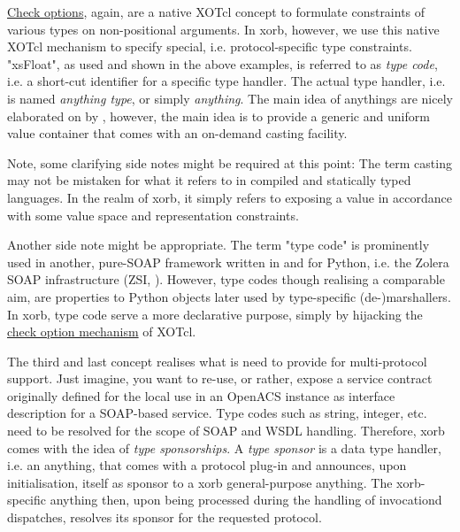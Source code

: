 \href{http://media.wu-wien.ac.at/doc/tutorial.html#non-pos-args}{Check options}, again, are a native XOTcl concept to formulate constraints of various types on non-positional arguments. In xorb, however, we use this native XOTcl mechanism to specify special, i.e. protocol-specific type constraints. "xsFloat", as used and shown in the above examples, is referred to as \emph{type code}, i.e. a short-cut identifier for a specific type handler. The actual type handler, i.e.  is named \emph{anything type}, or simply \emph{anything}. The main idea of anythings are nicely elaborated on by \cite{sommerlad:1998,maetzel:1996}, however, the main idea is to provide a generic and uniform value container that comes with an on-demand casting facility. 
\begin{hints}
\item Note, some clarifying side notes might be required at this point: The term casting may not be mistaken for what it refers to in compiled and statically typed languages. In the realm of xorb, it simply refers to exposing a value in accordance with some value space and representation constraints.
\item Another side note might be appropriate. The term "type code" is prominently used in another, pure-SOAP framework written in and for Python, i.e. the Zolera SOAP infrastructure (ZSI, \cite{zsi:2007}). However, type codes though realising a comparable aim, are properties to Python objects later used by type-specific (de-)marshallers. In xorb, type code serve a more declarative purpose, simply by hijacking the \href{http://media.wu-wien.ac.at/doc/tutorial.html#non-pos-args}{check option mechanism} of XOTcl.
\end{hints}
The third and last concept realises what is need to provide for multi-protocol support. Just imagine, you want to re-use, or rather, expose a service contract originally defined for the local use in an OpenACS instance as interface description for a SOAP-based service. Type codes such as string, integer, etc. need to be resolved for the scope of SOAP and WSDL handling. Therefore, xorb comes with the idea of \emph{type sponsorships}. A \emph{type sponsor} is a data type handler, i.e. an anything, that comes with a protocol plug-in and announces, upon initialisation, itself as sponsor to a xorb general-purpose anything. The xorb-specific anything then, upon being processed during the handling of invocationd dispatches, resolves its sponsor for the requested protocol. 

